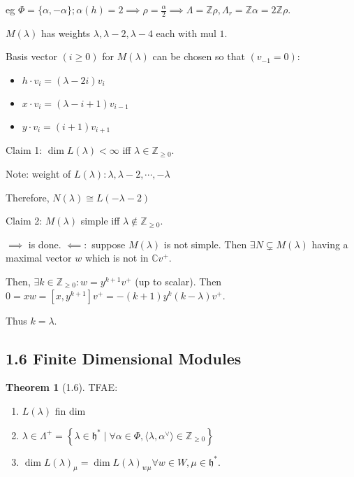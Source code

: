 \documentclass{article}
\theoremstyle{definition}
\newtheorem{theorem}{Theorem}
\begin{document}
    eg \(\Phi = \{ \alpha , -\alpha \}; \alpha(h) = 2 \implies \rho = \frac{\alpha }{2} \implies \Lambda = \mathbb{Z} \rho, \Lambda_r = \mathbb{Z}\alpha = 2 \mathbb{Z} \rho\).

    \(M(\lambda)\) has weights \(\lambda, \lambda-2, \lambda-4\) each with mul \(1\).

    Basis vector \((i \geq 0)\) for \(M(\lambda)\) can be chosen so that \((v_{-1} = 0)\):

    \begin{itemize}
        \item \(h \cdot v_i = (\lambda - 2i) v_i\) 
        \item \(x \cdot v_i = (\lambda - i + 1) v_{i-1}\)
        \item \(y \cdot v_i = (i+1) v_{i+1}\)  
    \end{itemize} 

    Claim 1: \(\dim L(\lambda) < \infty\) iff \(\lambda \in \mathbb{Z}_{\geq 0}\).

    Note: weight of \(L(\lambda): \lambda , \lambda -2, \cdots ,-\lambda\)

    Therefore, \(N(\lambda) \cong L(-\lambda - 2)\)

    Claim 2: \(M(\lambda)\) simple iff \(\lambda \notin \mathbb{Z}_{\geq 0}\).

    \(\implies \) is done. \(\impliedby:\) suppose \(M(\lambda)\) is not simple. Then \(\exists N \subsetneq M(\lambda)\) having a maximal vector \(w\) which is not in \(\mathbb{C} v^+\).

    Then, \(\exists k \in \mathbb{Z}_{\geq 0}: w = y^{k+1} v^+\) (up to scalar). Then \(0 = xw = [x,y^{k+1}] v^+ = -(k+1)y^k(k-\lambda)v^+\).
    
    Thus \(k = \lambda\).

    \subsection*{1.6 Finite Dimensional Modules}

    \begin{theorem}
        [1.6] TFAE:

        \begin{enumerate}[label=\alph*)]
            \item \(L(\lambda)\) fin dim
            \item \(\lambda \in \Lambda^+ = \left\{ \lambda \in \mathfrak{h}^{\ast} \mid \forall \alpha \in \Phi , \langle \lambda , \alpha^\vee \rangle \in \mathbb{Z}_{\geq 0} \right\} \) 
            \item \(\dim L(\lambda)_\mu = \dim L(\lambda)_{w \mu} \forall w\in W, \mu \in \mathfrak{h}^{\ast}\). 
        \end{enumerate} 
    \end{theorem}
\end{document}
